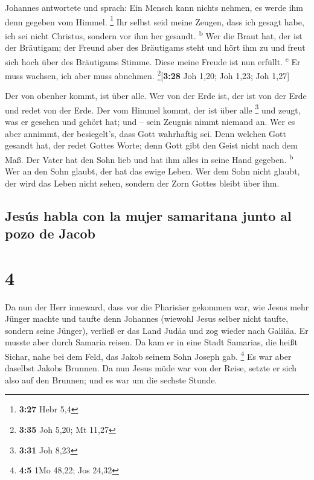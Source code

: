  Johannes antwortete und sprach: Ein Mensch kann nichts
nehmen, es werde ihm denn gegeben vom Himmel. \footnote{\textbf{3:27}
  Hebr 5,4}  Ihr selbst seid meine Zeugen, dass ich
gesagt habe, ich sei nicht Christus, sondern vor ihm her gesandt.
\textsuperscript{b}  Wer die Braut hat, der ist der
Bräutigam; der Freund aber des Bräutigams steht und hört ihm zu und
freut sich hoch über des Bräutigams Stimme. Diese meine Freude ist nun
erfüllt. \textsuperscript{c}  Er muss wachsen, ich aber
muss abnehmen. \footnote{\textbf{3:35} Joh 5,20; Mt 11,27}{[}\textbf{3:28}
Joh 1,20; Joh 1,23; Joh 1,27{]}

 Der von obenher kommt, ist über alle. Wer von der Erde
ist, der ist von der Erde und redet von der Erde. Der vom Himmel kommt,
der ist über alle \footnote{\textbf{3:31} Joh 8,23}  und
zeugt, was er gesehen und gehört hat; und -- sein Zeugnis nimmt niemand
an.  Wer es aber annimmt, der besiegelt's, dass Gott
wahrhaftig sei.  Denn welchen Gott gesandt hat, der redet
Gottes Worte; denn Gott gibt den Geist nicht nach dem Maß.
 Der Vater hat den Sohn lieb und hat ihm alles in seine
Hand gegeben. \textsuperscript{b}  Wer an den Sohn
glaubt, der hat das ewige Leben. Wer dem Sohn nicht glaubt, der wird das
Leben nicht sehen, sondern der Zorn Gottes bleibt über ihm.

\hypertarget{jesuxfas-habla-con-la-mujer-samaritana-junto-al-pozo-de-jacob}{%
\subsection{Jesús habla con la mujer samaritana junto al pozo de
Jacob}\label{jesuxfas-habla-con-la-mujer-samaritana-junto-al-pozo-de-jacob}}

\hypertarget{section-3}{%
\section{4}\label{section-3}}

 Da nun der Herr inneward, dass vor die Pharisäer gekommen
war, wie Jesus mehr Jünger machte und taufte denn Johannes
 (wiewohl Jesus selber nicht taufte, sondern seine
Jünger),  verließ er das Land Judäa und zog wieder nach
Galiläa.  Er musste aber durch Samaria reisen.
 Da kam er in eine Stadt Samarias, die heißt Sichar, nahe
bei dem Feld, das Jakob seinem Sohn Joseph gab. \footnote{\textbf{4:5}
  1Mo 48,22; Jos 24,32}  Es war aber daselbst Jakobs
Brunnen. Da nun Jesus müde war von der Reise, setzte er sich also auf
den Brunnen; und es war um die sechste Stunde.

